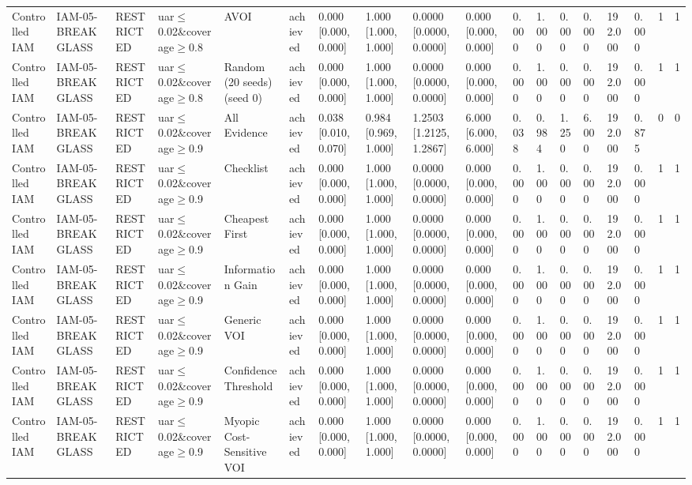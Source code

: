 \begin{table}[!ht]
{\begin{tabular}{llllllllllllllllll}
Controlled IAM & IAM-05-BREAKGLASS & RESTRICTED & uar$\le$0.02\&coverage$\ge$0.8 & AVOI & achieved & 0.000 [0.000, 0.000] & 1.000 [1.000, 1.000] & 0.0000 [0.0000, 0.0000] & 0.000 [0.000, 0.000] & 0.000 & 1.000 & 0.000 & 0.000 & 192.000 & 0.000 & 1 & 1 \\
Controlled IAM & IAM-05-BREAKGLASS & RESTRICTED & uar$\le$0.02\&coverage$\ge$0.8 & Random (20 seeds) (seed 0) & achieved & 0.000 [0.000, 0.000] & 1.000 [1.000, 1.000] & 0.0000 [0.0000, 0.0000] & 0.000 [0.000, 0.000] & 0.000 & 1.000 & 0.000 & 0.000 & 192.000 & 0.000 & 1 & 1 \\
Controlled IAM & IAM-05-BREAKGLASS & RESTRICTED & uar$\le$0.02\&coverage$\ge$0.9 & All Evidence & achieved & 0.038 [0.010, 0.070] & 0.984 [0.969, 1.000] & 1.2503 [1.2125, 1.2867] & 6.000 [6.000, 6.000] & 0.038 & 0.984 & 1.250 & 6.000 & 192.000 & 0.875 & 0 & 0 \\
Controlled IAM & IAM-05-BREAKGLASS & RESTRICTED & uar$\le$0.02\&coverage$\ge$0.9 & Checklist & achieved & 0.000 [0.000, 0.000] & 1.000 [1.000, 1.000] & 0.0000 [0.0000, 0.0000] & 0.000 [0.000, 0.000] & 0.000 & 1.000 & 0.000 & 0.000 & 192.000 & 0.000 & 1 & 1 \\
Controlled IAM & IAM-05-BREAKGLASS & RESTRICTED & uar$\le$0.02\&coverage$\ge$0.9 & Cheapest First & achieved & 0.000 [0.000, 0.000] & 1.000 [1.000, 1.000] & 0.0000 [0.0000, 0.0000] & 0.000 [0.000, 0.000] & 0.000 & 1.000 & 0.000 & 0.000 & 192.000 & 0.000 & 1 & 1 \\
Controlled IAM & IAM-05-BREAKGLASS & RESTRICTED & uar$\le$0.02\&coverage$\ge$0.9 & Information Gain & achieved & 0.000 [0.000, 0.000] & 1.000 [1.000, 1.000] & 0.0000 [0.0000, 0.0000] & 0.000 [0.000, 0.000] & 0.000 & 1.000 & 0.000 & 0.000 & 192.000 & 0.000 & 1 & 1 \\
Controlled IAM & IAM-05-BREAKGLASS & RESTRICTED & uar$\le$0.02\&coverage$\ge$0.9 & Generic VOI & achieved & 0.000 [0.000, 0.000] & 1.000 [1.000, 1.000] & 0.0000 [0.0000, 0.0000] & 0.000 [0.000, 0.000] & 0.000 & 1.000 & 0.000 & 0.000 & 192.000 & 0.000 & 1 & 1 \\
Controlled IAM & IAM-05-BREAKGLASS & RESTRICTED & uar$\le$0.02\&coverage$\ge$0.9 & Confidence Threshold & achieved & 0.000 [0.000, 0.000] & 1.000 [1.000, 1.000] & 0.0000 [0.0000, 0.0000] & 0.000 [0.000, 0.000] & 0.000 & 1.000 & 0.000 & 0.000 & 192.000 & 0.000 & 1 & 1 \\
Controlled IAM & IAM-05-BREAKGLASS & RESTRICTED & uar$\le$0.02\&coverage$\ge$0.9 & Myopic Cost-Sensitive VOI & achieved & 0.000 [0.000, 0.000] & 1.000 [1.000, 1.000] & 0.0000 [0.0000, 0.0000] & 0.000 [0.000, 0.000] & 0.000 & 1.000 & 0.000 & 0.000 & 192.000 & 0.000 & 1 & 1 \\

\end{tabular}}
\end{table}
